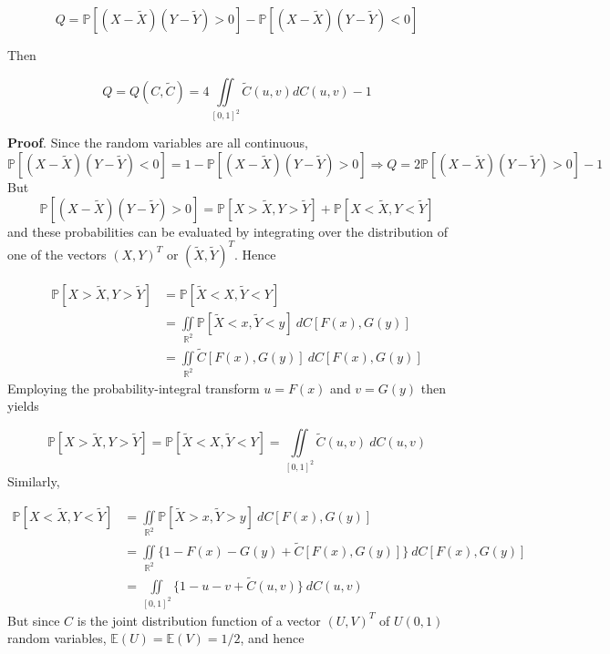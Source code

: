\documentclass{article}
\begin{document}
\begin{equation}
	Q=\mathbb{P}[(X-\tilde X)(Y-\tilde Y) > 0]-\mathbb{P}[(X-\tilde X)(Y-\tilde Y) < 0] 
\end{equation}

Then

\begin{equation}
	Q=Q(C, \tilde C) = 4 \iint\limits_{[0,1]^2} \tilde C (u,v) dC(u,v) -1
\end{equation}

\textbf{Proof}. Since the random variables are all continuous,
$$
\mathbb{P}[(X-\tilde X)(Y-\tilde Y) < 0] = 1 -\mathbb{P}[(X-\tilde X)(Y-\tilde Y) > 0] \Rightarrow Q = 2 
\mathbb{P}[(X-\tilde X)(Y-\tilde Y) > 0] - 1
$$
But
$$
\mathbb{P}[(X-\tilde X)(Y-\tilde Y) > 0] = \mathbb{P}[X > \tilde X, Y > \tilde Y] + \mathbb{P}[X <\tilde X, Y < \tilde Y]
$$
and these probabilities can be evaluated by integrating over the distribution of one of the vectors $(X, Y)^T$ or $(\tilde X, \tilde Y)^T$. Hence

\begin{align}
\mathbb{P}[X > \tilde X, Y > \tilde Y] & = \mathbb{P}[ \tilde X < X, \tilde Y < Y] \\
& = \iint\limits_{\mathbb{R}^2} \mathbb{P}[ \tilde X < x, \tilde Y < y] \> dC[F(x), G(y)] \\
& = \iint\limits_{\mathbb{R}^2} \tilde C [F(x), G(y)]  \> dC[F(x), G(y)]
\end{align}
Employing the probability-integral transform $u=F(x)$ and $v = G(y)$ then yields

\begin{equation}
\mathbb{P}[X > \tilde X, Y > \tilde Y] = \mathbb{P}[ \tilde X < X, \tilde Y < Y] 
= \iint\limits_{[0, 1]^2} \tilde C(u, v)  \> dC(u, v)
\end{equation}
Similarly,

\begin{align}
\mathbb{P}[X < \tilde X, Y < \tilde Y] & = \iint\limits_{\mathbb{R}^2} \mathbb{P}[ \tilde X > x, \tilde Y > y] \> dC[F(x), G(y)] \\
& = \iint\limits_{\mathbb{R}^2} \bigl\{1 - F(x) - G(y) + \tilde C[F(x), G(y)]    \bigr\}  \> dC[F(x), G(y)] \\
& = \iint\limits_{[0, 1]^2} \bigl\{1 - u - v + \tilde C(u, v)   \bigr\}  \> dC(u, v)
\end{align}
But since $C$ is the joint distribution function of a vector $(U, V)^T$ of $U(0, 1)$ random variables, $\mathbb{E}(U) = \mathbb{E}(V) = 1/2$, and hence
\end{document}
